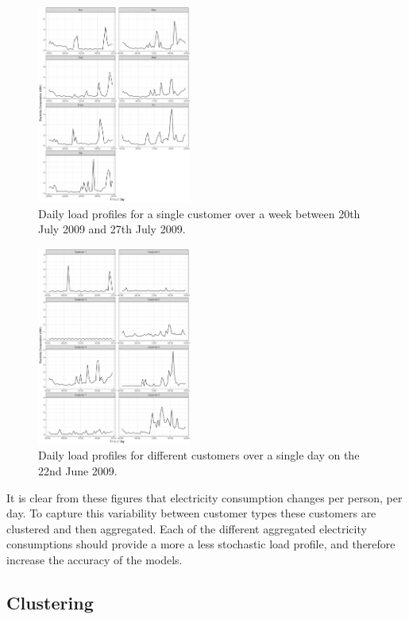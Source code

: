 \begin{figure}
	\includegraphics[width=0.45\textwidth]{Chapter5/figures/Rplot01}
	\caption{Daily load profiles for a single customer over a week between 20th July 2009 and 27th July 2009.}
	\label{fig:single_user}
\end{figure}

\begin{figure}
	\includegraphics[width=0.45\textwidth]{Chapter5/figures/Rplot02}
	\caption{Daily load profiles for different customers over a single day on the 22nd June 2009.}
	\label{fig:multiple_users}
\end{figure}

It is clear from these figures that electricity consumption changes per person, per day. To capture this variability between customer types these customers are clustered and then aggregated. Each of the different aggregated electricity consumptions should provide a more a less stochastic load profile, and therefore increase the accuracy of the models.

\subsection{Clustering}


